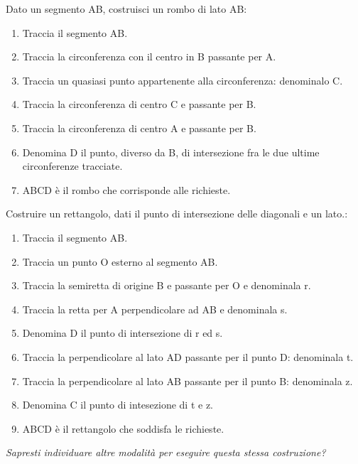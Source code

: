 \begin{procedura}
	Dato un segmento AB, costruisci un rombo di lato AB:
	\begin{enumerate} [nosep]
		\item 
		Traccia il segmento AB. 
		\item 
		Traccia la circonferenza con il centro in B passante per A.
		\item 
		Traccia un quasiasi punto appartenente alla circonferenza: denominalo C.
		\item 
		Traccia la circonferenza di centro C e passante per B.
		\item 
		Traccia la circonferenza di centro A e passante per B.
		\item 
		Denomina D il punto, diverso da B, di intersezione  fra le due ultime circonferenze tracciate.
		\item 
		ABCD è il rombo che corrisponde alle richieste.
	\end{enumerate}
\end{procedura}



\begin{procedura}
	Costruire un rettangolo, dati il punto di intersezione delle diagonali e un lato.:
	\begin{enumerate} [nosep]
		\item 
		Traccia il segmento AB.
		\item 
		Traccia un punto O esterno al segmento AB.
		\item 
		Traccia la semiretta di origine B e passante per O e denominala r.
		\item 
		Traccia la retta per A perpendicolare ad AB e denominala s.
		\item
		Denomina D il punto di intersezione di r ed s.
		\item
		Traccia la perpendicolare al lato AD passante per il punto D: denominala t.
		\item
		Traccia la perpendicolare al lato AB passante per il punto B: denominala z.
		\item
		Denomina C il punto di intesezione di t e z.
		\item 
		ABCD è il rettangolo che soddisfa le richieste.
	\end{enumerate}
	\textit{Sapresti individuare altre modalità per eseguire questa stessa costruzione? }
\end{procedura}

